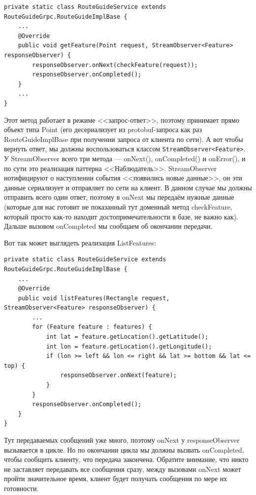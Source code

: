 \documentclass{../../text-style}
\begin{document}
\begin{verbatim}
private static class RouteGuideService extends RouteGuideGrpc.RouteGuideImplBase {
    ...
    @Override
    public void getFeature(Point request, StreamObserver<Feature> responseObserver) {
        responseObserver.onNext(checkFeature(request));
        responseObserver.onCompleted();
    }
    ...
}
\end{verbatim}

Этот метод работает в режиме <<запрос-ответ>>, поэтому принимает прямо объект типа Point (его десериализует из protobuf-запроса как раз RouteGuideImplBase при получении запроса от клиента по сети). А вот чтобы вернуть ответ, мы должны воспользоваться классом \texttt{StreamObserver<Feature>}. У StreamObserver всего три метода --- onNext(), onCompleted() и onError(), и по сути это реализация паттерна <<Наблюдатель>>. StreamObserver нотифицируют о наступлении события <<появились новые данные>>, он эти данные сериализует и отправляет по сети на клиент. В данном случае мы должны отправить всего один ответ, поэтому в onNext мы передаём нужные данные (которые для нас готовит не показанный тут доменный метод checkFeature, который просто как-то находит достопримечательности в базе, не важно как). Дальше вызовом onCompleted мы сообщаем об окончании передачи.

Вот так может выглядеть реализация ListFeatures:

\begin{verbatim}
private static class RouteGuideService extends RouteGuideGrpc.RouteGuideImplBase {
    ...
    @Override
    public void listFeatures(Rectangle request, StreamObserver<Feature> responseObserver) {
        ...
        for (Feature feature : features) {
            int lat = feature.getLocation().getLatitude();
            int lon = feature.getLocation().getLongitude();
            if (lon >= left && lon <= right && lat >= bottom && lat <= top) {
                responseObserver.onNext(feature);
            }
        }
        responseObserver.onCompleted();
    }
}
\end{verbatim}

Тут передаваемых сообщений уже много, поэтому onNext у responseObserver вызывается в цикле. Но по окончании цикла мы должны вызвать onCompleted, чтобы сообщить клиенту, что передача закончена. Обратите внимание, что никто не заставляет передавать все сообщения сразу, между вызовами onNext может пройти значительное время, клиент будет получать сообщения по мере их готовности.
\end{document}
